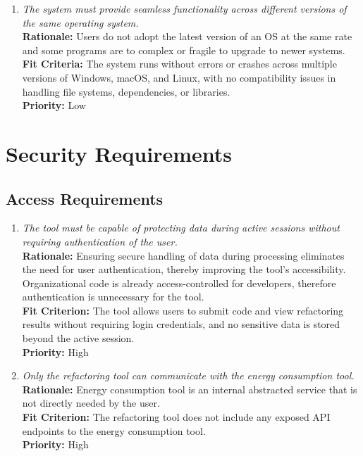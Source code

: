 \documentclass[12pt]{article}
\begin{document}
\begin{enumerate}[label=MS-AD \arabic*., wide=0pt, leftmargin=*]
  \item \emph{The system must provide seamless functionality across
    different versions of the same operating system.}\\
    {\bf Rationale:} Users do not adopt the latest version of an OS
    at the same rate and some programs are to complex or fragile to
    upgrade to newer systems.\\
    {\bf Fit Criteria:} The system runs without errors or crashes
    across multiple versions of Windows, macOS, and Linux, with no
    compatibility issues in handling file systems, dependencies, or libraries.\\
    {\bf Priority:} Low

\end{enumerate}

\section{Security Requirements}
\subsection{Access Requirements}
\begin{enumerate}[label=SR-AR \arabic*., wide=0pt, leftmargin=*]
  \item \emph{The tool must be capable of protecting data during
    active sessions without requiring authentication of the user.}\\[2mm]
    {\bf Rationale:} Ensuring secure handling of data during
    processing eliminates the need for user authentication, thereby
    improving the tool's accessibility. Organizational code is
    already access-controlled for developers, therefore
    authentication is unnecessary for the tool.\\
    {\bf Fit Criterion:} The tool allows users to submit code and
    view refactoring results without requiring login credentials, and
    no sensitive data is stored beyond the active session.\\
    {\bf Priority:} High
  \item \emph{Only the refactoring tool can communicate with the
    energy consumption tool.}\\
    {\bf Rationale:} Energy consumption tool is an internal
    abstracted service that is not directly needed by the user.\\
    {\bf Fit Criterion:} The refactoring tool does not include any
    exposed API endpoints to the energy consumption tool.\\
    {\bf Priority:} High
\end{enumerate}
\end{document}
